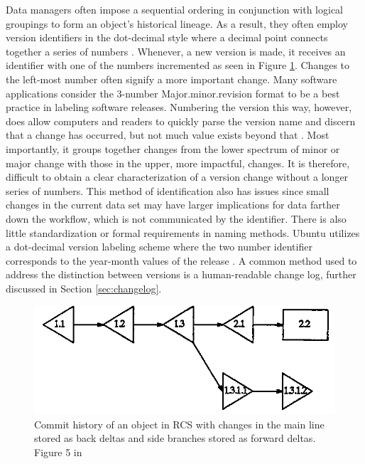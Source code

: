Data managers often impose a sequential ordering in conjunction with logical groupings to form an object's historical lineage.
As a result, they often employ version identifiers in the dot-decimal style where a decimal point connects together a series of numbers \cite{Stuckenholz:2005:CEV:1039174.1039197}.
Whenever, a new version is made, it receives an identifier with one of the numbers incremented as seen in Figure \ref{RCSTree}.
Changes to the left-most number often signify a more important change.
Many software applications consider the 3-number Major.minor.revision format to be a best practice in labeling software releases.
Numbering the version this way, however, does allow computers and readers to quickly parse the version name and discern that a change has occurred, but not much value exists beyond that \cite{Dijkstra1994}.
Most importantly, it groups together changes from the lower spectrum of minor or major change with those in the upper, more impactful, changes.
It is therefore, difficult to obtain a clear characterization of a version change without a longer series of numbers.
This method of identification also has issues since small changes in the current data set may have larger implications for data farther down the workflow, which is not communicated by the identifier.
There is also little standardization or formal requirements in naming methods.
Ubuntu utilizes a dot-decimal version labeling scheme where the two number identifier corresponds to the year-month values of the release \cite{Ubuntu}.
A common method used to address the distinction between versions is a human-readable change log, further discussed in Section \ref{sec:changelog}.

\begin{figure}
	\centering
	\includegraphics[scale=0.75]{figures/RCSCommitTree.png}
	\caption{Commit history of an object in RCS with changes in the main line stored as back deltas and side branches stored as forward deltas.  Figure 5 in \cite{tichy1985rcs}}
	\label{RCSTree}
\end{figure}



